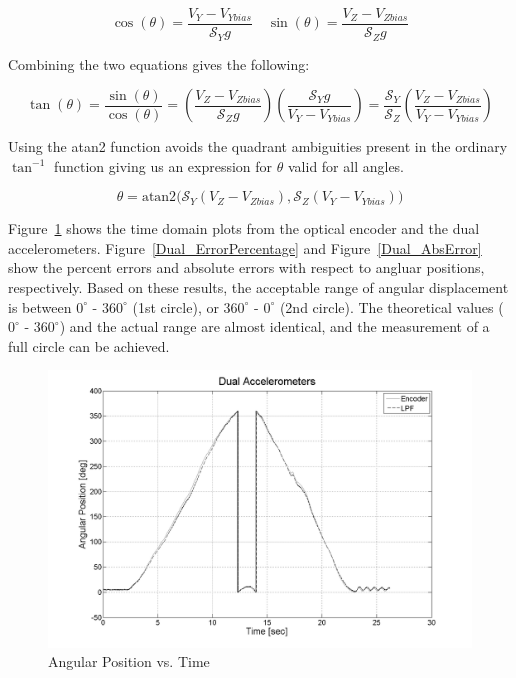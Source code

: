 \documentclass{article}
\theoremstyle{plain}
\theoremstyle{definition}
\theoremstyle{remark}
\newcommand{\Sens}{\mathcal{S}}
\begin{document}
$$ \cos(\theta) = \frac{V_Y-V_{Ybias}}{\Sens_{Y} g} \quad \sin(\theta) = \frac{V_{Z} - V_{Zbias}}{\Sens_{Z} g} $$

Combining the two equations gives the following:

$$ \tan(\theta) = \frac{\sin(\theta)}{\cos(\theta)} = \left(\frac{V_{Z} - V_{Zbias}}{\Sens_{Z} g}\right) \left( \frac{\Sens_{Y} g}{V_Y-V_{Ybias}} \right) = \frac{\Sens_{Y}}{\Sens_{Z}} \left( \frac{V_{Z} - V_{Zbias}}{V_{Y} - V_{Ybias}} \right)$$

Using the atan2 function avoids the quadrant ambiguities present in the ordinary $\tan^{-1}$ function giving us an expression for $\theta$ valid for all angles.

$$\theta = \text{atan2}\big( \Sens_{Y} \left( V_{Z} - V_{Zbias}\right),  \Sens_{Z} \left( V_{Y} - V_{Ybias}\right) \big)$$

Figure~\ref{Dual_TimeDomain} shows the time domain plots from the optical encoder and the dual accelerometers. Figure~\ref{Dual_ErrorPercentage} and Figure~\ref{Dual_AbsError} show the percent errors and absolute errors with respect to angluar positions, respectively. Based on these results, the acceptable range of angular displacement is between $0^\circ$ - $360^\circ$ (1st circle), or $360^\circ$ - $0^\circ$ (2nd circle). The theoretical values ( $0^\circ$ - $360^\circ$) and the actual range are almost identical, and the measurement of a full circle can be achieved. 

\begin{figure}[hbt]
\begin{center}
\includegraphics[width = 13cm]{Dual_TimeDomain.png}
\caption{Angular Position vs. Time}
\label{Dual_TimeDomain}
\end{center}
\end{figure}
\end{document}

